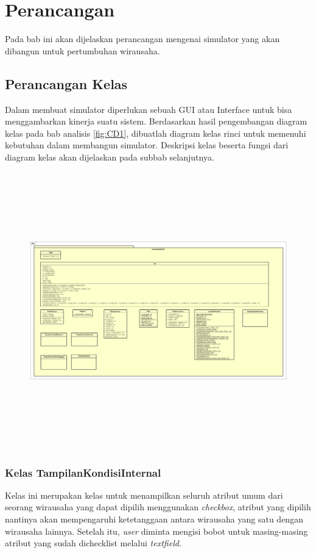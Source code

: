 \chapter{Perancangan}
\label{chap:perancangan}

Pada bab ini akan dijelaskan perancangan mengenai simulator yang akan dibangun untuk pertumbuhan wirausaha.

\section{Perancangan Kelas}
\label{sec:perancangankelas}

Dalam membuat simulator diperlukan sebuah GUI atau Interface untuk bisa menggambarkan kinerja suatu sistem. Berdasarkan hasil pengembangan diagram kelas pada bab analisis \ref{fig:CD1}, dibuatlah diagram kelas rinci untuk memenuhi kebutuhan dalam membangun simulator. Deskripsi kelas beserta fungsi dari diagram kelas akan dijelaskan pada subbab selanjutnya.

\begin{figure} [H]
	\centering  
	\includegraphics[width=18cm, height=12cm]{ClassDiagram2} 
	\label{fig:classdiagram2} 
\end{figure}

\subsection{Kelas TampilanKondisiInternal}
Kelas ini merupakan kelas untuk menampilkan seluruh atribut umum dari seorang wirausaha yang dapat dipilih menggunakan \textit{checkbox}, atribut yang dipilih nantinya akan mempengaruhi ketetanggaan antara wirausaha yang satu dengan wirausaha lainnya. Setelah itu, \textit{user} diminta mengisi bobot untuk masing-masing atribut yang sudah dichecklist melalui \textit{textfield}.


